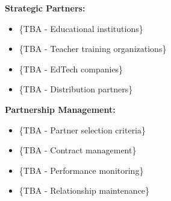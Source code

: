 \textbf{Strategic Partners:}
\begin{itemize}
    \item \{TBA - Educational institutions\}
    \item \{TBA - Teacher training organizations\}
    \item \{TBA - EdTech companies\}
    \item \{TBA - Distribution partners\}
\end{itemize}

\textbf{Partnership Management:}
\begin{itemize}
    \item \{TBA - Partner selection criteria\}
    \item \{TBA - Contract management\}
    \item \{TBA - Performance monitoring\}
    \item \{TBA - Relationship maintenance\}
\end{itemize}